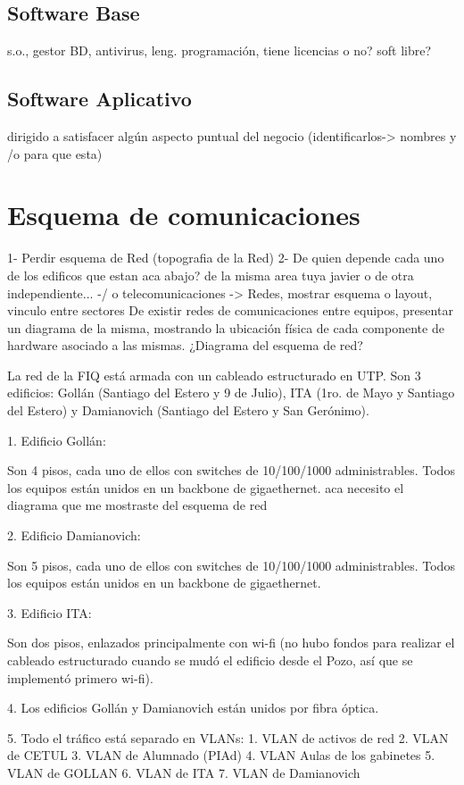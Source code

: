 \documentclass[10pt,a4paper,final]{article}
\begin{document}
\subsection{Software Base}
s.o., gestor BD, antivirus, leng. programación, tiene licencias o no? soft libre?

\subsection{Software Aplicativo}
dirigido a satisfacer algún aspecto puntual del negocio (identificarlos-> nombres y /o para que esta)

\section{Esquema de comunicaciones}
1- Perdir esquema de Red (topografia de la Red)
2- De quien depende cada uno de los edificos que estan aca abajo? de la misma area tuya javier o de otra independiente...
-/ o telecomunicaciones -> Redes, mostrar esquema o layout, vinculo entre sectores
 De existir redes de comunicaciones entre equipos, presentar un diagrama de la misma, mostrando la ubicación física de cada componente de hardware asociado a las mismas.
¿Diagrama del esquema de red?

La red de la FIQ está armada con un cableado estructurado en UTP. Son 3 edificios: Gollán (Santiago del Estero y 9 de Julio), ITA (1ro. de Mayo y Santiago del Estero) y Damianovich (Santiago del Estero y San Gerónimo).

1. Edificio Gollán:

  Son 4 pisos, cada uno de ellos con switches de 10/100/1000 administrables. Todos los equipos están unidos en un backbone de gigaethernet.
aca necesito el diagrama que me mostraste del esquema de red

2. Edificio Damianovich: 

  Son 5 pisos, cada uno de ellos con switches de 10/100/1000 administrables. Todos los equipos están unidos en un backbone de gigaethernet. 

3. Edificio ITA: 

  Son dos pisos, enlazados principalmente con wi-fi (no hubo fondos para realizar el cableado estructurado cuando se mudó el edificio desde el Pozo, así que se implementó primero wi-fi).

4. Los edificios Gollán y Damianovich están unidos por fibra óptica.

5. Todo el tráfico está separado en VLANs: 
  1. VLAN de activos de red
  2. VLAN de CETUL
  3. VLAN de Alumnado (PIAd)
  4. VLAN Aulas de los gabinetes
  5. VLAN de GOLLAN
  6. VLAN de ITA
  7. VLAN de Damianovich
\end{document}
